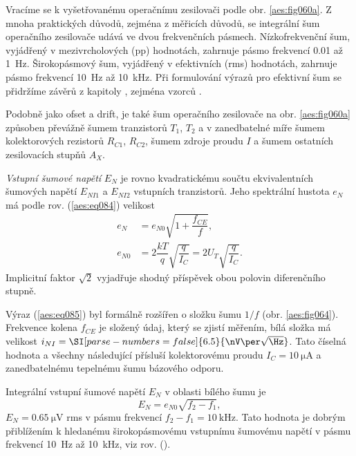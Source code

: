         Vracíme se k vyšetřovanému operačnímu zesilovači podle obr. \ref {aes:fig060a}. Z mnoha
        praktických důvodů, zejména z měřicích důvodů, se integrální šum operačního zesilovače udává
        ve dvou frekvenčních pásmech. Nízkofrekvenční šum, vyjádřený v mezivrcholových (pp)
        hodnotách, zahrnuje pásmo frekvencí \num{0.01} až \SI{1}{\Hz}. Širokopásmový šum, vyjádřený
        v efektivních (rms) hodnotách, zahrnuje pásmo frekvencí \SI{10}{\Hz} až \SI{10}{\kHz}. Při
        formulování výrazů pro efektivní šum se přidržíme závěrů z kapitoly ,
        zejména vzorců .
        
        Podobně jako ofset a drift, je také šum operačního zesilovače na obr. \ref {aes:fig060a}
        způsoben převážně šumem tranzistorů \(T_1\), \(T_2\) a v zanedbatelné míře šumem
        kolektorových rezistorů \(R_{C1}\), \(R_{C2}\), šumem zdroje proudu \(I\) a šumem ostatních
        zesilovacích stupňů \(A_X\).

        \emph{Vstupní šumové napětí} \(E_N\) je rovno kvadratickému součtu ekvivalentních šumových
        napětí \(E_{NI1}\) a \(E_{NI2}\) vstupních tranzistorů. Jeho spektrální hustota \(e_N\) má
        podle rov. (\ref {aes:eq084}) velikost
        \begin{equation}\label{aes:eq085} 
          \begin{split}
            e_N    &= e_{N0}\sqrt{1 + \dfrac{f_{CE}}{f}},                             \\
            e_{N0} &= 2\dfrac{kT}{q}\sqrt{\dfrac{q}{I_C}} = 2U_T\sqrt{\dfrac{q}{I_C}}.
          \end{split}
        \end{equation}
        Implicitní faktor \(\sqrt{2}\) vyjadřuje shodný příspěvek obou polovin diferenčního stupně.

        Výraz (\ref {aes:eq085}) byl formálně rozšířen o složku šumu \(1/f\) (obr.
        \ref{aes:fig064}). Frekvence kolena \(f_{CE}\) je složený údaj, který se zjistí měřením,
        bílá složka má velikost \(i_{NI} = \SI[parse-numbers = false]{6.5}{\nV\per\sqrt{\Hz}}\).
        Tato číselná hodnota a všechny následující přísluší kolektorovému proudu \(I_C =
        \SI{10}{\uA}\) a zanedbatelnému tepelnému šumu bázového odporu.

        Integrální vstupní šumové napětí \(E_N\) v oblasti bílého šumu je
        \begin{equation}\label{aes:eq086}
          E_N = e_{N0}\sqrt{f_2 - f_1},
        \end{equation}
        \(E_N = \SI{0.65}{\uV}\) rms v pásmu frekvencí \(f_2 - f_1 = \SI{10}{\kHz}\). Tato hodnota
        je dobrým  přiblížením k hledanému širokopásmovému vstupnímu šumovému napětí v pásmu
        frekvencí \SI{10}{\Hz} až \SI{10}{\kHz}, viz rov. ().

